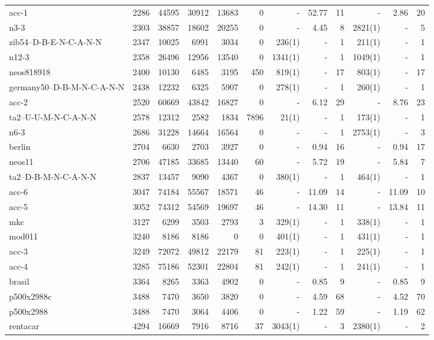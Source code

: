 \begin{sidewaystable}[Hp]
\begin{center}
\begin{tabular}{lrrrrr|rrr|rrr}
acc-1	&	2286	&	44595	&	30912	&	13683	&	0	&	-	&	52.77	&	11	&	-	&	2.86	&	20	\\
n3-3	&	2303	&	38857	&	18602	&	20255	&	0	&	-	&	4.45	&	8	&	2821(1)	&	-	&	5	\\
zib54--D-B-E-N-C-A-N-N	&	2347	&	10025	&	6991	&	3034	&	0	&	236(1)	&	-	&	1	&	211(1)	&	-	&	1	\\
n12-3	&	2358	&	26496	&	12956	&	13540	&	0	&	1341(1)	&	-	&	1	&	1049(1)	&	-	&	1	\\
neos818918	&	2400	&	10130	&	6485	&	3195	&	450	&	819(1)	&	-	&	17	&	803(1)	&	-	&	17	\\
germany50--D-B-M-N-C-A-N-N	&	2438	&	12232	&	6325	&	5907	&	0	&	278(1)	&	-	&	1	&	260(1)	&	-	&	1	\\
acc-2	&	2520	&	60669	&	43842	&	16827	&	0	&	-	&	6.12	&	29	&	-	&	8.76	&	23	\\
ta2--U-U-M-N-C-A-N-N	&	2578	&	12312	&	2582	&	1834	&	7896	&	21(1)	&	-	&	1	&	173(1)	&	-	&	1	\\
n6-3	&	2686	&	31228	&	14664	&	16564	&	0	&	-	&	-	&	1	&	2753(1)	&	-	&	3	\\
berlin	&	2704	&	6630	&	2703	&	3927	&	0	&	-	&	0.94	&	16	&	-	&	0.94	&	17	\\
neos11	&	2706	&	47185	&	33685	&	13440	&	60	&	-	&	5.72	&	19	&	-	&	5.84	&	7	\\
ta2--D-B-M-N-C-A-N-N	&	2837	&	13457	&	9090	&	4367	&	0	&	380(1)	&	-	&	1	&	464(1)	&	-	&	1	\\
acc-6	&	3047	&	74184	&	55567	&	18571	&	46	&	-	&	11.09	&	14	&	-	&	11.09	&	10	\\
acc-5	&	3052	&	74312	&	54569	&	19697	&	46	&	-	&	14.30	&	11	&	-	&	13.84	&	11	\\
mkc	&	3127	&	6299	&	3503	&	2793	&	3	&	329(1)	&	-	&	1	&	338(1)	&	-	&	1	\\
mod011	&	3240	&	8186	&	8186	&	0	&	0	&	401(1)	&	-	&	1	&	431(1)	&	-	&	1	\\
acc-3	&	3249	&	72072	&	49812	&	22179	&	81	&	223(1)	&	-	&	1	&	225(1)	&	-	&	1	\\
acc-4	&	3285	&	75186	&	52301	&	22804	&	81	&	242(1)	&	-	&	1	&	241(1)	&	-	&	1	\\
brasil	&	3364	&	8265	&	3363	&	4902	&	0	&	-	&	0.85	&	9	&	-	&	0.85	&	9	\\
p500x2988c	&	3488	&	7470	&	3650	&	3820	&	0	&	-	&	4.59	&	68	&	-	&	4.52	&	70	\\
p500x2988	&	3488	&	7470	&	3064	&	4406	&	0	&	-	&	1.22	&	59	&	-	&	1.19	&	62	\\
rentacar	&	4294	&	16669	&	7916	&	8716	&	37	&	3043(1)	&	-	&	3	&	2380(1)	&	-	&	2	\\

\end{tabular}
\end{center}
\end{sidewaystable}
